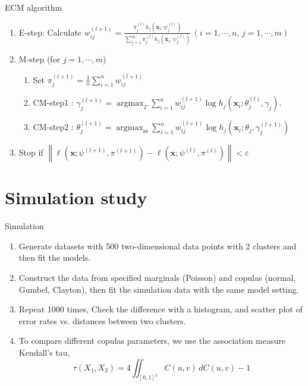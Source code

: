 \documentclass{beamer}
\DeclareMathOperator*{\argmax}{argmax}
\begin{document}
\begin{frame}{ECM algorithm}
    \begin{enumerate}
        \item E-step: Calculate
        $\displaystyle w_{ij}^{(l+1)} = \frac{\pi_j^{(l)} h_j(\mathbf{x}_i;\psi_j^{(l)})}{\sum_{j=1}^m \pi_j^{(l)} h_j(\mathbf{x}_i;\psi_j^{(l)})} \, (i=1,\cdots,n, \, j=1,\cdots,m)$
        
        \item M-step (for $j=1,\cdots,m$) \\
        \begin{enumerate}
            \item Set 
            $\displaystyle \pi_j^{(l+1)} = \frac{1}{n} \sum_{i=1}^n w_{ij}^{(l+1)}$

            \item CM-step1 : 
            $\displaystyle \gamma_j^{(l+1)} = \argmax_\Gamma \sum_{i=1}^n w_{ij}^{(l+1)} \log h_j(\mathbf{x}_i;\theta_j^{(l)},\gamma_j)$.

            \item CM-step2 :
            $\displaystyle \theta_j^{(l+1)} = \argmax_\Theta \sum_{i=1}^n w_{ij}^{(l+1)} \log h_j(\mathbf{x}_i;\theta_j,\gamma_j^{(l+1)})$
        \end{enumerate}

        \item Stop if $\left\| \ell \left(\mathbf{x};\psi^{(l+1)},\pi^{(l+1)} \right) - \ell \left(\mathbf{x};\psi^{(l)},\pi^{(l)} \right) \right\| < \varepsilon$
    \end{enumerate}
\end{frame}


\section{Simulation study}

\begin{frame}{Simulation}
    \begin{enumerate}
        \item Generate datasets with 500 two-dimensional data points with 2 clusters and then fit the models.
        
        \item Construct the data from specified marginals (Poisson) and copulas (normal, Gumbel, Clayton), then fit the simulation data with the same model setting. 
        
        \item Repeat 1000 times, Check the difference with a histogram, and scatter plot of error rates vs. distances between two clusters.

        \item To compare different copulas parameters, we use the association measure Kendall's tau,
        \begin{equation*}
            \tau(X_1,X_2) = 4\iint_{[0,1]^2} C(u,v) \, dC(u,v) -1
        \end{equation*}
    \end{enumerate}
\end{frame}
\end{document}
